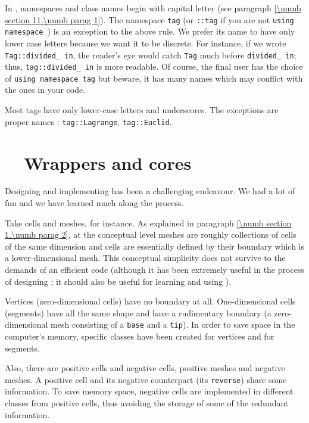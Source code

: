 In \maniFEM, namespaces and class names begin with capital letter
(see paragraph \ref{\numb section 11.\numb parag 1}).
The namespace {\small\tt\textcolor{tag}{tag}} (or {\small\tt {}::tag} if you are not
{\small\tt using namespace }) is an exception to the above rule.
We prefer its name to have only lower case letters because we want it to be
discrete. For instance, if we wrote {\small\tt\textcolor{tag}{Tag}::divided\_\,in},
the reader's eye would catch {\small\tt\textcolor{tag}{Tag}} much before {\small\tt divided\_\,in};
thus, {\small\tt\textcolor{tag}{tag}::divided\_\,in} is more readable.
Of course, the final user has the choice of {\small\tt using namespace \textcolor{tag}{tag}}
but beware, it has many names which may conflict with the ones in your code.

Most tags have only lower-case letters and underscores.
The exceptions are proper names : {\small\tt \textcolor{tag}{tag}::Lagrange}, {\small\tt \textcolor{tag}{tag}::Euclid}.


\section{~~Wrappers and cores}\label{\numb section 11.\numb parag 4}

Designing and implementing {\maniFEM} has been a challenging endeavour.
We had a lot of fun and we have learned much along the process.

Take cells and meshes, for instance.
As explained in paragraph \ref{\numb section 1.\numb parag 2}, at the conceptual level meshes
are roughly collections of cells of the same dimension and cells are essentially
defined by their boundary which is a lower-dimensional mesh.
This conceptual simplicity does not survive to the demands of an efficient code
(although it has been extremely useful in the process of designing \maniFEM;
it should also be useful for learning and using \maniFEM).

Vertices (zero-dimensional cells) have no boundary at all.
One-dimensional cells (segments) have all the same shape and have a rudimentary boundary
(a zero-dimensional mesh consisting of a {\small\tt base} and a {\small\tt tip}).
In order to save space in the computer's memory, specific classes have been created for
vertices and for segments.

Also, there are positive cells and negative cells, positive meshes and negative meshes.
A positive cell and its negative counterpart (its {\small\tt reverse}) share some information.
To save memory space, negative cells are implemented in different classes from
positive cells, thus avoiding the storage of some of the redundant information.

